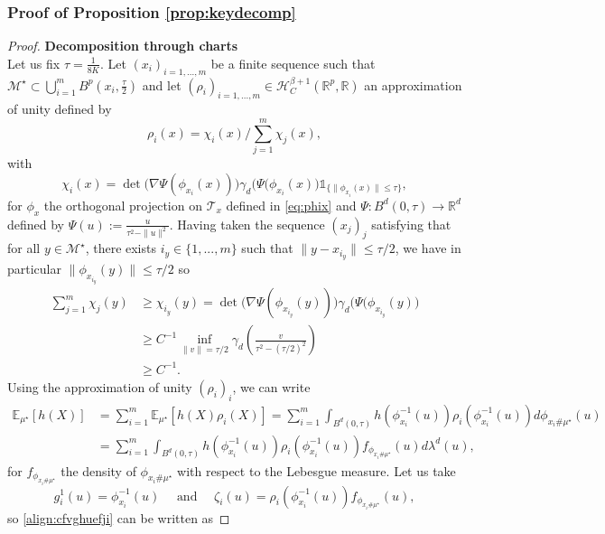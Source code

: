 \documentclass[10pt]{article}
\begin{document}
\subsubsection{Proof of Proposition \ref{prop:keydecomp}}\label{sec:prop:keydecomp}
\begin{proof}
\textbf{Decomposition through charts}\\
Let us fix $\tau = \frac{1}{8K}$. Let $(x_i)_{i=1,...,m}$ be a finite sequence such that $\mathcal{M}^\star\subset \bigcup \limits_{i=1}^m B^p(x_i,\frac{\tau}{2})$ and let $(\rho_i)_{i=1,...,m}\in \mathcal{H}^{\beta+1}_C(\mathbb{R}^p,\mathbb{R})$ an approximation of unity defined by
$$\rho_i(x)=\chi_i(x)/\sum_{j=1}^m\chi_j(x),$$
with
$$\chi_i(x) = \det\big(\nabla \Psi(\phi_{x_i}(x))\big) \gamma_d\big(\Psi(\phi_{x_i}(x)\big)\mathds{1}_{\{\|\phi_{x_i}(x)\|\leq \tau\}},$$
for $\phi_x$ the orthogonal projection on $\mathcal{T}_x$ defined in \eqref{eq:phix} and $\Psi:B^d(0,\tau)\rightarrow \mathbb{R}^d$ defined by 
    $\Psi(u):= \frac{u}{\tau^2-\|u\|^2}.$ Having taken the sequence $(x_j)_j$ satisfying that for all $y\in \mathcal{M}^\star$, there exists $i_y\in \{1,...,m\}$ such that $\|y-x_{i_y}\|\leq \tau/2$, we have in particular $\|\phi_{x_{i_y}}(y)\|\leq \tau/2$ so
\begin{align}\label{eq:cjisiqjdikdd}
    \sum_{j=1}^m\chi_j(y)&\geq \chi_{i_y}(y)= \det\big(\nabla \Psi(\phi_{x_{i_y}}(y))\big) \gamma_d\big(\Psi(\phi_{x_{i_y}}(y)\big)\nonumber\\
    & \geq C^{-1}\inf_{\|v\|=\tau/2}\gamma_d\left(\frac{v}{\tau^2-(\tau/2)^2}\right)\nonumber\\
   & \geq C^{-1}.
\end{align}
    Using the approximation of unity $(\rho_i)_i$, we can write 
    \begin{align}\label{align:cfvghuefji}
       \mathbb{E}_{\mu^\star}[h(X)] & =\sum \limits_{i=1}^m \mathbb{E}_{\mu^\star}[h(X)\rho_i(X)]=\sum \limits_{i=1}^m\int_{B^d(0,\tau)}h(\phi_{x_i}^{-1}(u))\rho_i(\phi_{x_i}^{-1}(u))d\phi_{x_i\# \mu^\star}(u)\\\nonumber
        & =\sum \limits_{i=1}^m\int_{B^d(0,\tau)}h(\phi_{x_i}^{-1}(u))\rho_i(\phi_{x_i}^{-1}(u))f_{\phi_{x_i\# \mu^\star}}(u)d\lambda^d(u),
    \end{align}
    for $f_{\phi_{x_i\# \mu^\star}}$ the density of $\phi_{x_i\# \mu^\star}$ with respect to the Lebesgue measure. Let us take 
    $$g_i^1(u)=\phi_{x_i}^{-1}(u) \quad \text{ and }\quad \zeta_i(u)=\rho_i(\phi_{x_i}^{-1}(u))f_{\phi_{x_i\# \mu^\star}}(u),$$
    so \eqref{align:cfvghuefji} can be written as

\end{proof}
\end{document}

